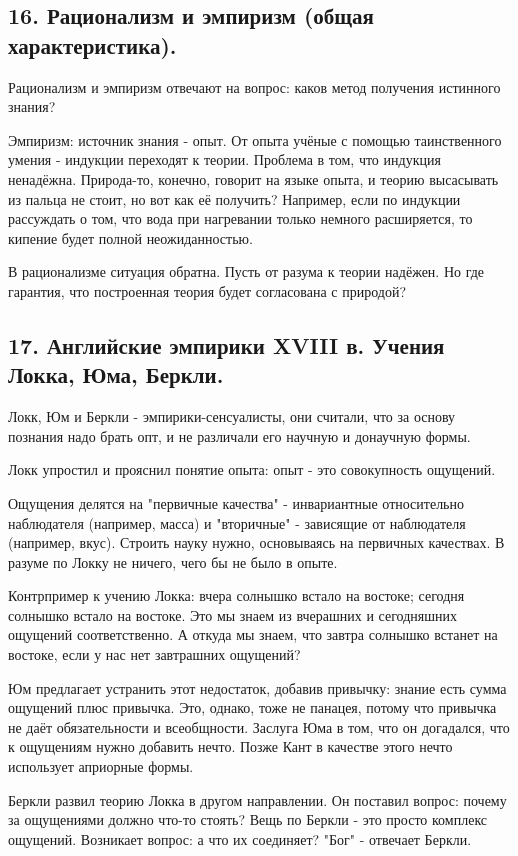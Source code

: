 \documentclass[a4paper, 12pt]{article}
\begin{document}
\subsection*{\textbf{16. Рационализм и эмпиризм (общая характеристика).}}

Рационализм и эмпиризм отвечают на вопрос: каков метод получения истинного знания?

Эмпиризм: источник знания - опыт.
От опыта учёные с помощью таинственного умения - индукции переходят к теории.
Проблема в том, что индукция ненадёжна.
Природа-то, конечно, говорит на языке опыта, и теорию высасывать из пальца не стоит, но вот как её получить?
Например, если по индукции рассуждать о том, что вода при нагревании только немного расширяется, то кипение будет полной неожиданностью.

В рационализме ситуация обратна.
Пусть от разума к теории надёжен.
Но где гарантия, что построенная теория будет согласована с природой?


\subsection*{\textbf{17. Английские эмпирики XVIII в. Учения Локка, Юма, Беркли.}}

Локк, Юм и Беркли - эмпирики-сенсуалисты, они считали, что за основу познания надо брать опт, и не различали его научную и донаучную формы.

Локк упростил и прояснил понятие опыта:
опыт - это совокупность ощущений.

Ощущения делятся на "первичные качества" - инвариантные относительно наблюдателя (например, масса) и "вторичные" - зависящие от наблюдателя (например, вкус).
Строить науку нужно, основываясь на первичных качествах.
В разуме по Локку не ничего, чего бы не было в опыте.

Контрпример к учению Локка: вчера солнышко встало на востоке; сегодня солнышко встало на востоке.
Это мы знаем из вчерашних и сегодняшних ощущений соответственно.
А откуда мы знаем, что завтра солнышко встанет на востоке, если у нас нет завтрашних ощущений?

Юм предлагает устранить этот недостаток, добавив привычку:
знание есть сумма ощущений плюс привычка.
Это, однако, тоже не панацея, потому что привычка не даёт обязательности и всеобщности.
Заслуга Юма в том, что он догадался, что к ощущениям нужно добавить нечто.
Позже Кант в качестве этого нечто использует априорные формы.

Беркли развил теорию Локка в другом направлении.
Он поставил вопрос: почему за ощущениями должно что-то стоять?
Вещь по Беркли - это просто комплекс ощущений.
Возникает вопрос: а что их соединяет?
"Бог" - отвечает Беркли.
\end{document}
